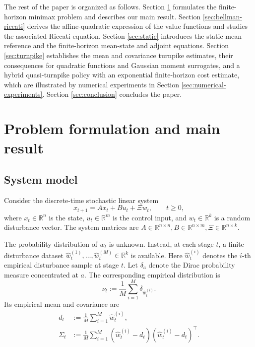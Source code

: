 \documentclass[10pt,journal,twoside]{IEEEtran}
\theoremstyle{definition}
\theoremstyle{remark}
\begin{document}
The rest of the paper is organized as follows. Section \ref{sec:problem} formulates the finite-horizon minimax problem and describes our main result.
Section \ref{sec:bellman-riccati} derives the affine-quadratic expression of the value functions and
studies the associated Riccati equation. Section \ref{sec:static} introduces the static mean reference and the finite-horizon mean-state and
adjoint equations. Section \ref{sec:turnpike} establishes the mean and covariance turnpike estimates, their consequences for quadratic functions and Gaussian moment surrogates, and a hybrid quasi-turnpike policy with an exponential finite-horizon cost estimate, which are illustrated by numerical experiments in Section \ref{sec:numerical-experiments}.
Section \ref{sec:conclusion} concludes the paper.













\section{Problem formulation and main result}
\label{sec:problem}

\subsection{System model}
\label{subsec:finite-horizon-problem}

Consider the discrete-time stochastic linear system
\begin{equation}
	x_{t+1}=Ax_t+Bu_t+\Xi w_t,
	\qquad t\ge 0,
	\label{eq:sys}
\end{equation}
where \(x_t\in\mathbb R^n\) is the state, \(u_t\in\mathbb R^m\) is the control input, and \(w_t\in\mathbb R^k\) is a random disturbance vector.  The system matrices are
\(
A\in\mathbb R^{n\times n},
B\in\mathbb R^{n\times m},
\Xi\in\mathbb R^{n\times k}.
\)

The probability distribution of \(w_t\) is unknown.  Instead, at each stage \(t\), a finite disturbance dataset
\(
\widehat w_t^{(1)},\ldots,\widehat w_t^{(M)}\in\mathbb R^k
\)
is available.  Here \(\widehat w_t^{(i)}\) denotes the \(i\)-th empirical disturbance sample at stage \(t\).  Let \(\delta_a\) denote the Dirac probability measure concentrated at \(a\).  The corresponding empirical distribution is
\begin{equation}
	\nu_t:=\frac1M\sum_{i=1}^M\delta_{\widehat w_t^{(i)}} .
	\label{eq:empirical-law}
\end{equation}
 Its empirical mean and covariance are
\begin{equation}
	\begin{aligned}
		d_t
		&:=
		\frac1M\sum_{i=1}^M\widehat w_t^{(i)},\\
		\Sigma_t
		&:=
		\frac1M\sum_{i=1}^M
		(\widehat w_t^{(i)}-d_t)
		(\widehat w_t^{(i)}-d_t)^\top .
	\end{aligned}
	\label{eq:mean-cov}
\end{equation}
\end{document}
